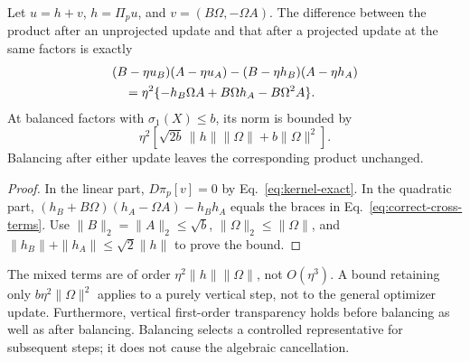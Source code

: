 \begin{proposition}
\label{prop:correct-drift}
Let $u=h+v$, $h=\Pi_pu$, and $v=(B\Omega,-\Omega A)$.
The difference between the product after an unprojected update and that
after a projected update at the same factors is exactly
\begin{align}
 &(B-\eta u_B)(A-\eta u_A)-(B-\eta h_B)(A-\eta h_A)\notag\\
 &\quad=\eta^2\{-h_B\Omega A+B\Omega h_A-B\Omega^2A\}.
 \label{eq:correct-cross-terms}
\end{align}
At balanced factors with $\sigma_1(X)\leq b$, its norm is bounded by
\begin{equation}
 \eta^2\left[\sqrt{2b}\,\|h\|\|\Omega\|+b\|\Omega\|^2\right].
 \label{eq:correct-injection}
\end{equation}
Balancing after either update leaves the corresponding product unchanged.
\end{proposition}
\begin{proof}
In the linear part, $D\pi_p[v]=0$ by Eq.~\eqref{eq:kernel-exact}.
In the quadratic part,
$(h_B+B\Omega)(h_A-\Omega A)-h_Bh_A$
equals the braces in Eq.~\eqref{eq:correct-cross-terms}.
Use $\|B\|_2=\|A\|_2\leq\sqrt b$,
$\|\Omega\|_2\leq\|\Omega\|$, and
$\|h_B\|+\|h_A\|\leq\sqrt2\|h\|$ to prove the bound.
\end{proof}

The mixed terms are of order $\eta^2\|h\|\|\Omega\|$, not
$O(\eta^3)$. A bound retaining only $b\eta^2\|\Omega\|^2$ applies to
a purely vertical step, not to the general optimizer update. Furthermore,
vertical first-order transparency holds before balancing as well as after
balancing. Balancing selects a controlled representative for subsequent
steps; it does not cause the algebraic cancellation.

